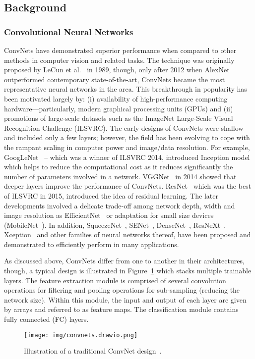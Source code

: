 \documentclass{ieeeaccess}
\begin{document}
\subsection{Background}
\subsubsection{Convolutional Neural Networks}
ConvNets have demonstrated superior performance when compared to other methods in computer vision and related tasks. The technique was originally proposed by LeCun et al.~\cite{lecun1989backpropagation} in 1989, though, only after 2012 when AlexNet~\cite{krizhevsky2012imagenet} outperformed contemporary state-of-the-art, ConvNets became the most representative neural networks in the area. This breakthrough in popularity has been motivated largely by: (i) availability of high-performance computing hardware—particularly, modern graphical processing units (GPUs) and (ii) promotions of large-scale datasets such as the ImageNet Large-Scale Visual Recognition Challenge (ILSVRC). The early designs of ConvNets were shallow and included only a few layers; however, the field has been evolving to cope with the rampant scaling in computer power and image/data resolution. For example, GoogLeNet~\cite{szegedy2015going} -- which was a winner of ILSVRC 2014, introduced Inception model which helps to reduce the computational cost as it reduces significantly the number of parameters involved in a network. VGGNet~\cite{simonyan2014very} in 2014 showed that deeper layers improve the performance of ConvNets. ResNet~\cite{he2016deep} which was the best of ILSVRC in 2015, introduced the idea of residual learning. The later developments involved a delicate trade-off among network depth, width and image resolution as EfficientNet~\cite{tan2019efficientnet} or adaptation for small size devices (MobileNet~\cite{howard2017mobilenets}). In addition, SqueezeNet~\cite{iandola2016squeezenet}, SENet~\cite{hu2018squeeze}, DenseNet~\cite{iandola2014densenet}, ResNeXt~\cite{xie2017aggregated}, Xception~\cite{chollet2017xception} and other families of neural networks thereof, have been proposed and demonstrated to efficiently perform in many applications.

As discussed above, ConvNets differ from one to another in their architectures, though, a typical design is illustrated in Figure~\ref{fig:convnet} which stacks multiple trainable layers. The feature extraction module is comprised of several convolution operations for filtering and pooling operations for sub-sampling (reducing the network size). Within this module, the input and output of each layer are given by arrays and referred to as feature maps. The classification module contains fully connected (FC) layers.
\begin{figure} [hbt!]
\begin{center}
\texttt{[image: img/convnets.drawio.png]}
\caption{Illustration of a traditional ConvNet design~\cite{lecun2010convolutional}.}
\label{fig:convnet}
\end{center}
\end{figure}
\end{document}
